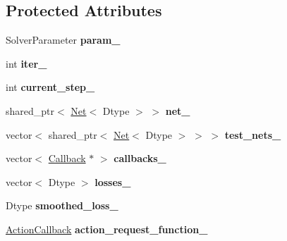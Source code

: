 \subsection*{Protected Attributes}
\begin{DoxyCompactItemize}
\item 
Solver\+Parameter {\bfseries param\+\_\+}\hypertarget{classcaffe_1_1Solver_a718d67175eba4eb6195b19ef38c3f17a}{}\label{classcaffe_1_1Solver_a718d67175eba4eb6195b19ef38c3f17a}

\item 
int {\bfseries iter\+\_\+}\hypertarget{classcaffe_1_1Solver_ade2a806f82be02b91f3c7c08d234dbbb}{}\label{classcaffe_1_1Solver_ade2a806f82be02b91f3c7c08d234dbbb}

\item 
int {\bfseries current\+\_\+step\+\_\+}\hypertarget{classcaffe_1_1Solver_a6531b137643b2acfd45ee57906a54f65}{}\label{classcaffe_1_1Solver_a6531b137643b2acfd45ee57906a54f65}

\item 
shared\+\_\+ptr$<$ \hyperlink{classcaffe_1_1Net}{Net}$<$ Dtype $>$ $>$ {\bfseries net\+\_\+}\hypertarget{classcaffe_1_1Solver_a93c9e9a8c4d0fd56432b12daf75dea04}{}\label{classcaffe_1_1Solver_a93c9e9a8c4d0fd56432b12daf75dea04}

\item 
vector$<$ shared\+\_\+ptr$<$ \hyperlink{classcaffe_1_1Net}{Net}$<$ Dtype $>$ $>$ $>$ {\bfseries test\+\_\+nets\+\_\+}\hypertarget{classcaffe_1_1Solver_ac8d1b92851465b530a82a695782c4eda}{}\label{classcaffe_1_1Solver_ac8d1b92851465b530a82a695782c4eda}

\item 
vector$<$ \hyperlink{classcaffe_1_1Solver_1_1Callback}{Callback} $\ast$ $>$ {\bfseries callbacks\+\_\+}\hypertarget{classcaffe_1_1Solver_ae768f16b8ef9e69741d383aae032cd95}{}\label{classcaffe_1_1Solver_ae768f16b8ef9e69741d383aae032cd95}

\item 
vector$<$ Dtype $>$ {\bfseries losses\+\_\+}\hypertarget{classcaffe_1_1Solver_a3184c6647e3a842717638c7a31506f45}{}\label{classcaffe_1_1Solver_a3184c6647e3a842717638c7a31506f45}

\item 
Dtype {\bfseries smoothed\+\_\+loss\+\_\+}\hypertarget{classcaffe_1_1Solver_aaf306d832ed4706ea3168ac759dccc2b}{}\label{classcaffe_1_1Solver_aaf306d832ed4706ea3168ac759dccc2b}

\item 
\hyperlink{namespacecaffe_a79ce9ffbdd44b367252e0b8cf99bf430}{Action\+Callback} {\bfseries action\+\_\+request\+\_\+function\+\_\+}\hypertarget{classcaffe_1_1Solver_a12a6f4f96ff0edf14d0fd4686b00fe33}{}\label{classcaffe_1_1Solver_a12a6f4f96ff0edf14d0fd4686b00fe33}


\end{DoxyCompactItemize}
